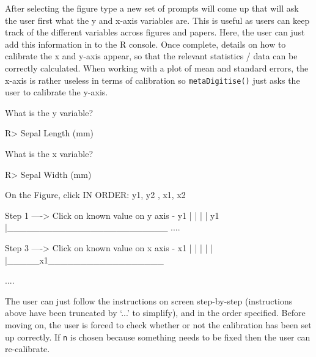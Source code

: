 \documentclass[12pt]{article}
\newcommand{\code}[1]{\texttt{#1}}
\newcommand{\fct}[1]{\texttt{#1()}}
\let\proglang=\textsf
\begin{document}
After selecting the figure type a new set of prompts will come up that will ask the user first what the y and x-axis variables are. This is useful as users can keep track of the different variables across figures and papers. Here, the user can just add this information in to the \proglang{R} console. Once complete, details on how to calibrate the x and y-axis appear, so that the relevant statistics / data can be correctly calculated. When working with a plot of mean and standard errors, the x-axis is rather useless in terms of calibration so \fct{metaDigitise} just asks the user to calibrate the y-axis. 

\begin{CodeChunk}
\begin{CodeOutput}
What is the y variable? 
\end{CodeOutput}
\begin{CodeInput}
R> Sepal Length (mm)
\end{CodeInput}

\begin{CodeOutput}
What is the x variable? 
\end{CodeOutput}
\begin{CodeInput}
R> Sepal Width (mm)
\end{CodeInput}

\begin{CodeOutput}
On the Figure, click IN ORDER: 
      y1, y2 , x1, x2  


    Step 1 ----> Click on known value on y axis - y1
  |
  |
  |
  |
  y1
  |_________________________
  ....

    Step 3 ----> Click on known value on x axis - x1
  |
  |
  |
  |
  |
  |_____x1__________________

  ....
\end{CodeOutput}
\end{CodeChunk}

The user can just follow the instructions on screen step-by-step (instructions above have been truncated by `...' to simplify), and in the order specified. Before moving on, the user is forced to check whether or not the calibration has been set up correctly. If \code{n} is chosen because something needs to be fixed then the user can re-calibrate.
\end{document}
